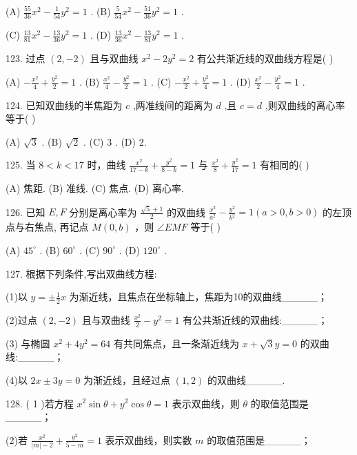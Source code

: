 \documentclass[10pt]{article}
\begin{document}
(A) \(\frac{55}{36}{x}^{2} - \frac{1}{54}{y}^{2} = 1\) . (B) \(\frac{5}{54}{x}^{2} - \frac{51}{36}{y}^{2} = 1\) .

(C) \(\frac{13}{81}{x}^{2} - \frac{13}{36}{y}^{2} = 1\) . (D) \(\frac{13}{36}{x}^{2} - \frac{13}{81}{y}^{2} = 1\) .

123. 过点 \(\left( {2, - 2}\right)\) 且与双曲线 \({x}^{2} - 2{y}^{2} = 2\) 有公共渐近线的双曲线方程是( )

(A) \(- \frac{{x}^{2}}{4} + \frac{{y}^{2}}{2} = 1\) . (B) \(\frac{{x}^{2}}{4} - \frac{{y}^{2}}{2} = 1\) . (C) \(- \frac{{x}^{2}}{2} + \frac{{y}^{2}}{4} = 1\) . (D) \(\frac{{x}^{2}}{2} - \frac{{y}^{2}}{4} = 1\) .

124. 已知双曲线的半焦距为 \(c\) ,两准线间的距离为 \(d\) ,且 \(c = d\) ,则双曲线的离心率等于( )

(A) \(\sqrt{3}\) . (B) \(\sqrt{2}\) . (C) 3 . (D) 2.

125. 当 \(8 < k < {17}\) 时，曲线 \(\frac{{x}^{2}}{{17} - k} + \frac{{y}^{2}}{8 - k} = 1\) 与 \(\frac{{x}^{2}}{8} + \frac{{y}^{2}}{17} = 1\) 有相同的( )

(A) 焦距. (B) 准线. (C) 焦点. (D) 离心率.

126. 已知 \(E,F\) 分别是离心率为 \(\frac{\sqrt{5} + 1}{2}\) 的双曲线 \(\frac{{x}^{2}}{{a}^{2}} - \frac{{y}^{2}}{{b}^{2}} = 1\left( {a > 0,b > 0}\right)\) 的左顶点与右焦点, 再记点 \(M\left( {0,b}\right)\) ，则 \(\angle {EMF}\) 等于( )

(A) \({45}^{ \circ  }\) . (B) \({60}^{ \circ  }\) . (C) \({90}^{ \circ  }\) . (D) \({120}^{ \circ  }\) .

127. 根据下列条件,写出双曲线方程:

(1)以 \(y =  \pm  \frac{1}{2}x\) 为渐近线，且焦点在坐标轴上，焦距为10的双曲线\_\_\_\_\_；

(2)过点 \(\left( {2, - 2}\right)\) 且与双曲线 \(\frac{{x}^{2}}{2} - {y}^{2} = 1\) 有公共渐近线的双曲线:\_\_\_\_\_；

(3) 与椭圆 \({x}^{2} + 4{y}^{2} = {64}\) 有共同焦点，且一条渐近线为 \(x + \sqrt{3}y = 0\) 的双曲线:\_\_\_\_\_；

(4)以 \({2x} \pm  {3y} = 0\) 为渐近线，且经过点 \(\left( {1,2}\right)\) 的双曲线\_\_\_\_\_.

128. ( 1 )若方程 \({x}^{2}\sin \theta  + {y}^{2}\cos \theta  = 1\) 表示双曲线，则 \(\theta\) 的取值范围是\_\_\_\_\_；

(2)若 \(\frac{{x}^{2}}{\left| m\right|  - 2} + \frac{{y}^{2}}{5 - m} = 1\) 表示双曲线，则实数 \(m\) 的取值范围是\_\_\_\_\_；
\end{document}
